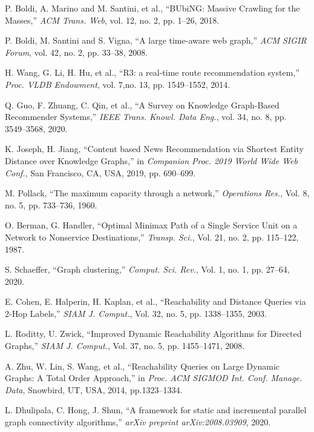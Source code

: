 \documentclass[lettersize,journal]{IEEEtran} %
\begin{document}
\begin{thebibliography}{100}
  P. Boldi, A. Marino and M. Santini, et al.,  ``BUbiNG: Massive Crawling for the Masses,''  \textit{ACM Trans. Web}, vol. 12, no. 2, pp. 1--26, 2018.
  
  P. Boldi, M. Santini and S. Vigna,  ``A large time-aware web graph,''  \textit{ACM SIGIR Forum}, vol. 42, no. 2, pp. 33--38, 2008.
  
  H. Wang, G. Li, H. Hu, et al., ``R3: a real-time route recommendation system,'' \textit{Proc. VLDB Endowment}, vol. 7,no. 13, pp. 1549--1552, 2014.
  
  Q. Guo, F. Zhuang, C. Qin, et al., ``A Survey on Knowledge Graph-Based Recommender Systems,'' \textit{IEEE Trans. Knowl. Data Eng.}, vol. 34, no. 8, pp. 3549--3568, 2020.
  
  K. Joseph, H. Jiang, ``Content based News Recommendation via Shortest Entity Distance over Knowledge Graphs,'' in \textit{Companion Proc. 2019 World Wide Web Conf.}, San Francisco, CA, USA, 2019, pp. 690--699.
  
  M. Pollack, ``The maximum capacity through a network,'' \textit{Operations Res.}, Vol. 8, no. 5, pp. 733--736, 1960.
  
  O. Berman, G. Handler, ``Optimal Minimax Path of a Single Service Unit on a Network to Nonservice Destinations,'' \textit{Transp. Sci.}, Vol. 21, no. 2, pp. 115--122, 1987.
  
  S. Schaeffer, ``Graph clustering,'' \textit{Comput. Sci. Rev.}, Vol. 1, no. 1, pp. 27--64, 2020.



  E. Cohen, E. Halperin, H. Kaplan, et al., ``Reachability and Distance Queries via 2-Hop Labels,'' \textit{SIAM J. Comput.}, Vol. 32, no. 5, pp. 1338--1355, 2003.
  
  L. Roditty, U. Zwick, ``Improved Dynamic Reachability Algorithms for Directed Graphs,'' \textit{SIAM J. Comput.}, Vol. 37, no. 5, pp. 1455--1471, 2008.
  
  A. Zhu, W. Lin, S. Wang, et al., ``Reachability Queries on Large Dynamic Graphs: A Total Order Approach,'' in \textit{Proc. ACM SIGMOD Int. Conf. Manage. Data}, Snowbird, UT, USA, 2014, pp.1323--1334.
  
  L. Dhulipala, C. Hong, J. Shun, ``A framework for static and incremental parallel graph connectivity algorithms,'' \textit{arXiv preprint arXiv:2008.03909}, 2020. 


\end{thebibliography}
\end{document}
